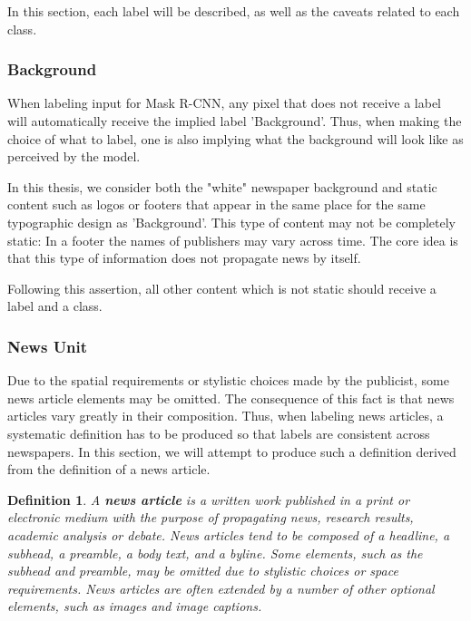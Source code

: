 \documentclass[oneside, english, bibtex]{kththesis}
\begin{document}
In this section, each label will be described, as well as the caveats related to each class.

\subsubsection{Background}

When labeling input for Mask R-CNN, any pixel that does not receive a label will automatically receive the implied label 'Background'.
Thus, when making the choice of what to label, one is also implying what the background will look like as perceived by the model.

In this thesis, we consider both the "white" newspaper background and static content such as logos or footers that appear in the same place for the same typographic design as 'Background'.
This type of content may not be completely static: In a footer the names of publishers may vary across time. The core idea is that this type of information does not propagate news by itself.

Following this assertion, all other content which is not static should receive a label and a class.

\subsubsection{News Unit}

Due to the spatial requirements or stylistic choices made by the publicist, some news article elements may be omitted.
The consequence of this fact is that news articles vary greatly in their composition.
Thus, when labeling news articles, a systematic definition has to be produced so that labels are consistent across newspapers.
In this section, we will attempt to produce such a definition derived from the definition of a news article.

\newtheorem{lemma}{Lemma}[chapter]
\newcommand{\lemmaautorefname}{Lemma}
\newtheorem{definition}[lemma]{Definition}
\newcommand{\definitionautorefname}{Definition}

\begin{definition}
\label{newsarticle}
A \textbf{news article} is a written work published in a print or electronic medium with the purpose of propagating news, research results, academic analysis or debate.
News articles tend to be composed of a headline, a subhead, a preamble, a body text, and a byline.
Some elements, such as the subhead and preamble, may be omitted due to stylistic choices or space requirements.
News articles are often extended by a number of other optional elements, such as images and image captions.
\end{definition}
\end{document}

